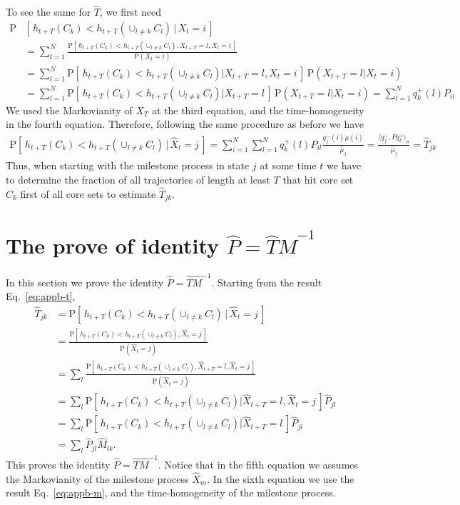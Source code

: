 \documentclass[journal=jctcce,manuscript=article]{achemso}
\newcommand{\fwd}[0]{+}
\newcommand{\bwd}[0]{-}
\newcommand{\prob}{\textrm{P}}
\begin{document}
To see the same for $\hat{T}$, we first need
\begin{align*}
  \prob & [\,h_{t+T}(C_k) < h_{t+T}(\cup_{l\neq k} C_l) \,\vert\, X_t = i\,]\\
  &=
  \sum_{l=1}^N
  \frac{\prob [\,h_{t+T}(C_k) < h_{t+T}(\cup_{l\neq k} C_l), X_{t+T} = l, X_t = i\,]}
  {\prob (X_t = i)} \\
  &=
  \sum_{l=1}^N
  {\prob [\,h_{t+T}(C_k) < h_{t+T}(\cup_{l\neq k} C_l) \vert X_{t+T} = l, X_t = i\,]}\,
  {\prob( X_{t+T} = l \vert X_t = i)}\\
  & =
  \sum_{l=1}^N
  {\prob [\,h_{t+T}(C_k) < h_{t+T}(\cup_{l\neq k} C_l) \vert X_{t+T} = l\,]}\,
  {\prob( X_{t+T} = l \vert X_t = i)}  = \sum_{l=1}^N
  q^\fwd_k(l) P_{il}
\end{align*}
We used the Markovianity of $X_T$ at the third equation,
and the time-homogeneity in the fourth equation.
Therefore, following the same procedure as before we have
\begin{align}\label{eq:appb-t}
  \prob [\,h_{t+T}(C_k) < h_{t+T}(\cup_{l\neq k} C_l) \,\vert\, \hat X_t = j\,]=
  \sum_{i=1}^N\sum_{l=1}^N
  q^\fwd_k(l) P_{il}
  \frac{q^\bwd_j(i) \mu(i)}{\hat \mu_j} = \frac{\langle q_j^\bwd, P q_k^\fwd\rangle_\mu}{\hat \mu_j}  = {\hat T}_{jk}
\end{align}
Thus, when starting with the milestone process in state $j$ at some time $t$ we have to determine the fraction of all trajectories of length at least $T$ that hit core set $C_k$ first of all core sets to estimate $\hat{T}_{jk}$.

\section{The prove of identity $\hat P = \hat T\hat M^{-1}$}
\label{sec:app-ptm}
In this section we prove the identity  $\hat P = \hat T\hat M^{-1}$. Starting from the
result Eq.~\eqref{eq:appb-t},
\begin{align*}
  \hat T_{jk} &=
  \prob [\,h_{t+T}(C_k) < h_{t+T}(\cup_{l\neq k} C_l) \,\vert\, \hat X_t = j\,]\\
  &=
  \frac{\prob [\,h_{t+T}(C_k) < h_{t+T}(\cup_{l\neq k} C_l), \hat X_t = j\,] }{\prob(\hat X_t = j)}\\
  & =
  \sum_l \frac{\prob [\,h_{t+T}(C_k) < h_{t+T}(\cup_{l\neq k} C_l), \hat X_{t+T} = l, \hat X_t = j\,] }{\prob(\hat X_t = j)}\\
  & =
  \sum_l \prob [\,h_{t+T}(C_k) < h_{t+T}(\cup_{l\neq k} C_l)\vert \hat X_{t+T} = l, \hat X_t = j\,] \hat P_{jl}\\  
  & =
  \sum_l \prob [\,h_{t+T}(C_k) < h_{t+T}(\cup_{l\neq k} C_l)\vert \hat X_{t+T} = l\,] \hat P_{jl}\\
  &= 
  \sum_l  \hat P_{jl}\hat M_{lk}.
\end{align*}
This proves the identity $\hat P = \hat T\hat M^{-1}$.
Notice that in the fifth equation we assumes the Markovianity of the milestone process $\hat X_m$. In the sixth equation we use the result Eq.~\eqref{eq:appb-m}, and the time-homogeneity of the milestone process.
\end{document}
